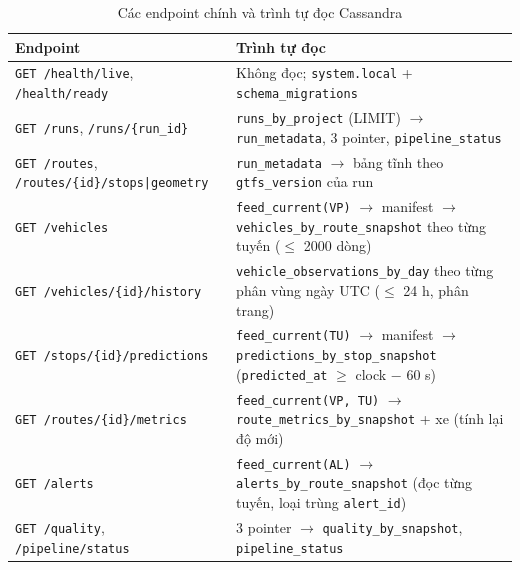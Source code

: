 \begin{table}[H]
\centering
\tablefont
\caption{Các endpoint chính và trình tự đọc Cassandra}
\label{tab:api}
\begin{tabular}{p{5.40cm}p{10.20cm}}
\toprule
\textbf{Endpoint} & \textbf{Trình tự đọc} \\
\midrule
\texttt{GET /health/live}, \texttt{/health/ready} & Không đọc; \texttt{system.local} + \texttt{schema\_migrations} \\
\texttt{GET /runs}, \texttt{/runs/\{run\_id\}} & \texttt{runs\_by\_project} (LIMIT) $\rightarrow$ \texttt{run\_metadata}, 3 pointer, \texttt{pipeline\_status} \\
\texttt{GET /routes}, \texttt{/routes/\{id\}/stops|geometry} & \texttt{run\_metadata} $\rightarrow$ bảng tĩnh theo \texttt{gtfs\_version} của run \\
\texttt{GET /vehicles} & \texttt{feed\_current(VP)} $\rightarrow$ manifest $\rightarrow$ \texttt{vehicles\_by\_route\_snapshot} theo từng tuyến ($\le$ 2000 dòng) \\
\texttt{GET /vehicles/\{id\}/history} & \texttt{vehicle\_observations\_by\_day} theo từng phân vùng ngày UTC ($\le$ 24 h, phân trang) \\
\texttt{GET /stops/\{id\}/predictions} & \texttt{feed\_current(TU)} $\rightarrow$ manifest $\rightarrow$ \texttt{predictions\_by\_stop\_snapshot} (\texttt{predicted\_at} $\ge$ clock $-$ 60 s) \\
\texttt{GET /routes/\{id\}/metrics} & \texttt{feed\_current(VP, TU)} $\rightarrow$ \texttt{route\_metrics\_by\_snapshot} + xe (tính lại độ mới) \\
\texttt{GET /alerts} & \texttt{feed\_current(AL)} $\rightarrow$ \texttt{alerts\_by\_route\_snapshot} (đọc từng tuyến, loại trùng \texttt{alert\_id}) \\
\texttt{GET /quality}, \texttt{/pipeline/status} & 3 pointer $\rightarrow$ \texttt{quality\_by\_snapshot}, \texttt{pipeline\_status} \\
\bottomrule
\end{tabular}
\end{table}

